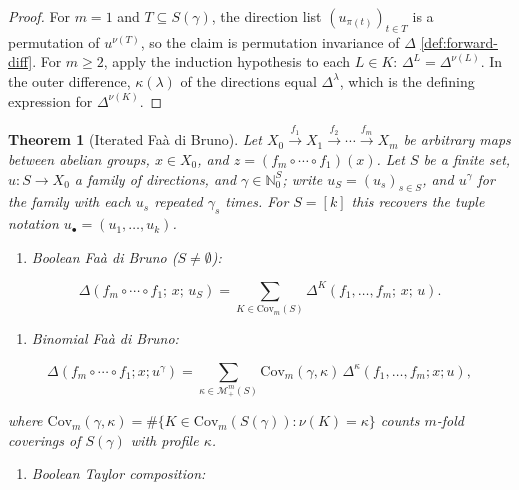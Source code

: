\documentclass[10pt,a4paper]{article}
\theoremstyle{plain}
\newtheorem{theorem}{Theorem}
\theoremstyle{definition}
\newcommand{\IN}{\mathbb{N}} %
\newcommand{\1}{\mathbb{1}} %
\newcommand{\set}[1]{\{#1\}} %
\newcommand{\tightlist}{\setlength{\itemsep}{0pt}\setlength{\parskip}{0pt}}
\newcommand{\KM}{\mathcal{M}} %
\newcommand{\Cov}{\mathrm{Cov}} %
\begin{document}
\begin{proof}

For \(m = 1\) and \(T \subseteq S(\gamma)\), the direction list
\((u_{\pi(t)})_{t \in T}\) is a permutation of \(u^{\nu(T)}\), so the
claim is permutation invariance of \(\Delta\) \ref{def:forward-diff}.
For \(m \geq 2\), apply the induction hypothesis to each \(L \in K\):
\(\Delta^L = \Delta^{\nu(L)}\). In the outer difference,
\(\kappa(\lambda)\) of the directions equal \(\Delta^\lambda\), which is
the defining expression for \(\Delta^{\nu(K)}\).

\end{proof}

\begin{theorem}[Iterated Faà di Bruno]

\label{thm:iterated-dfdb} Let
\(X_0 \xrightarrow{f_1} X_1 \xrightarrow{f_2} \cdots \xrightarrow{f_m} X_m\)
be arbitrary maps between abelian groups, \(x \in X_0\), and
\(z = (f_m \circ \cdots \circ f_1)(x)\). Let \(S\) be a finite set,
\(u: S \to X_0\) a family of directions, and \(\gamma \in \IN_0^S\);
write \(u_S = (u_s)_{s \in S}\), and \(u^\gamma\) for the family with
each \(u_s\) repeated \(\gamma_s\) times. For \(S = [k]\) this recovers
the tuple notation \(u_\bullet = (u_1, \dots, u_k)\).

\begin{enumerate}
\def\labelenumi{\arabic{enumi})}
\tightlist
\item
  \emph{Boolean Faà di Bruno} (\(S \neq \emptyset\))\emph{:}
\end{enumerate}

\[
  \Delta(f_m \circ \cdots \circ f_1;\, x;\, u_S)
  =
  \sum_{K \in \Cov_m(S)}
  \Delta^{K}(f_1, \dots, f_m;\, x;\, u).
\]

\begin{enumerate}
\def\labelenumi{\arabic{enumi})}
\setcounter{enumi}{1}
\tightlist
\item
  \emph{Binomial Faà di Bruno:}
\end{enumerate}

\[
  \Delta(f_m \circ \cdots \circ f_1; x; u^\gamma) = \sum_{\kappa \in \KM_+^m(S)} \Cov_m(\gamma, \kappa)\, \Delta^{\kappa}(f_1, \dots, f_m; x; u),
\]

where
\(\Cov_m(\gamma, \kappa) = \#\set{K \in \Cov_m(S(\gamma)) : \nu(K) = \kappa}\)
counts \(m\)-fold coverings of \(S(\gamma)\) with profile \(\kappa\).

\begin{enumerate}
\def\labelenumi{\arabic{enumi})}
\setcounter{enumi}{2}
\tightlist
\item
  \emph{Boolean Taylor composition:}
\end{enumerate}


\end{theorem}
\end{document}
